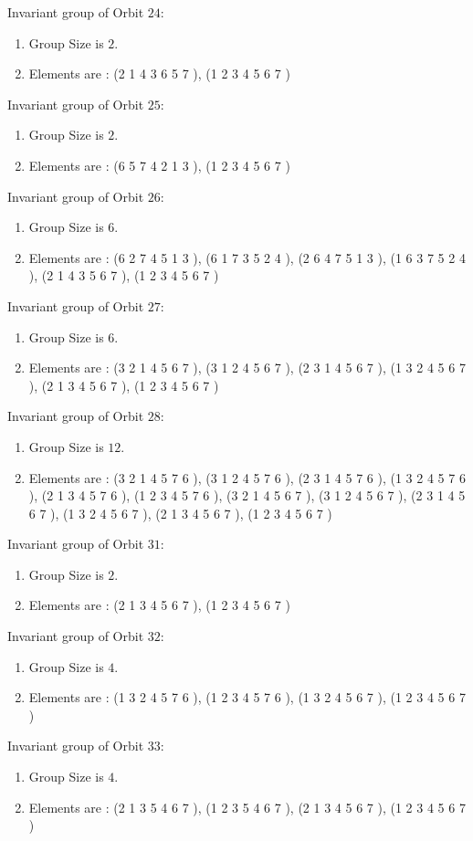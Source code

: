 \documentclass[12pt]{article}
\begin{document}
Invariant group of Orbit $24$:
\begin{enumerate}
\item Group Size is $2$.
\item Elements are : (2 1 4 3 6 5 7  ), (1 2 3 4 5 6 7  )
\end{enumerate}
Invariant group of Orbit $25$:
\begin{enumerate}
\item Group Size is $2$.
\item Elements are : (6 5 7 4 2 1 3  ), (1 2 3 4 5 6 7  )
\end{enumerate}
Invariant group of Orbit $26$:
\begin{enumerate}
\item Group Size is $6$.
\item Elements are : (6 2 7 4 5 1 3  ), (6 1 7 3 5 2 4  ), (2 6 4 7 5 1 3  ), (1 6 3 7 5 2 4  ), (2 1 4 3 5 6 7  ), (1 2 3 4 5 6 7  )
\end{enumerate}
Invariant group of Orbit $27$:
\begin{enumerate}
\item Group Size is $6$.
\item Elements are : (3 2 1 4 5 6 7  ), (3 1 2 4 5 6 7  ), (2 3 1 4 5 6 7  ), (1 3 2 4 5 6 7  ), (2 1 3 4 5 6 7  ), (1 2 3 4 5 6 7  )
\end{enumerate}
Invariant group of Orbit $28$:
\begin{enumerate}
\item Group Size is $12$.
\item Elements are : (3 2 1 4 5 7 6  ), (3 1 2 4 5 7 6  ), (2 3 1 4 5 7 6  ), (1 3 2 4 5 7 6  ), (2 1 3 4 5 7 6  ), (1 2 3 4 5 7 6  ), (3 2 1 4 5 6 7  ), (3 1 2 4 5 6 7  ), (2 3 1 4 5 6 7  ), (1 3 2 4 5 6 7  ), (2 1 3 4 5 6 7  ), (1 2 3 4 5 6 7  )
\end{enumerate}
Invariant group of Orbit $31$:
\begin{enumerate}
\item Group Size is $2$.
\item Elements are : (2 1 3 4 5 6 7  ), (1 2 3 4 5 6 7  )
\end{enumerate}
Invariant group of Orbit $32$:
\begin{enumerate}
\item Group Size is $4$.
\item Elements are : (1 3 2 4 5 7 6  ), (1 2 3 4 5 7 6  ), (1 3 2 4 5 6 7  ), (1 2 3 4 5 6 7  )
\end{enumerate}
Invariant group of Orbit $33$:
\begin{enumerate}
\item Group Size is $4$.
\item Elements are : (2 1 3 5 4 6 7  ), (1 2 3 5 4 6 7  ), (2 1 3 4 5 6 7  ), (1 2 3 4 5 6 7  )
\end{enumerate}
\end{document}
